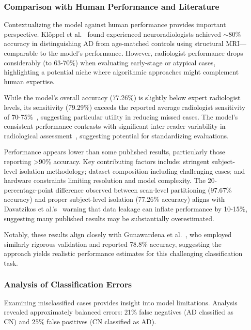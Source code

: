 \documentclass[11pt, a4paper]{article}
\begin{document}
\subsubsection{Comparison with Human Performance and Literature}

Contextualizing the model against human performance provides important perspective. Klöppel et al.~\cite{kloppel2008accuracy} found experienced neuroradiologists achieved $\sim$80\% accuracy in distinguishing AD from age-matched controls using structural MRI—comparable to the model's performance. However, radiologist performance drops considerably (to 63-70\%) when evaluating early-stage or atypical cases, highlighting a potential niche where algorithmic approaches might complement human expertise.

While the model's overall accuracy (77.26\%) is slightly below expert radiologist levels, its sensitivity (79.29\%) exceeds the reported average radiologist sensitivity of 70-75\%~\cite{frisoni2010clinical}, suggesting particular utility in reducing missed cases. The model's consistent performance contrasts with significant inter-reader variability in radiological assessment~\cite{kloppel2008accuracy}, suggesting potential for standardizing evaluations.

Performance appears lower than some published results, particularly those reporting >90\% accuracy. Key contributing factors include: stringent subject-level isolation methodology; dataset composition including challenging cases; and hardware constraints limiting resolution and model complexity. The 20-percentage-point difference observed between scan-level partitioning (97.67\% accuracy) and proper subject-level isolation (77.26\% accuracy) aligns with Davatzikos et al.'s~\cite{davatzikos2019machine} warning that data leakage can inflate performance by 10-15\%, suggesting many published results may be substantially overestimated.

Notably, these results align closely with Gunawardena et al.~\cite{gunawardena2017applying}, who employed similarly rigorous validation and reported 78.8\% accuracy, suggesting the approach yields realistic performance estimates for this challenging classification task.

\subsubsection{Analysis of Classification Errors}

Examining misclassified cases provides insight into model limitations. Analysis revealed approximately balanced errors: 21\% false negatives (AD classified as CN) and 25\% false positives (CN classified as AD).
\end{document}
